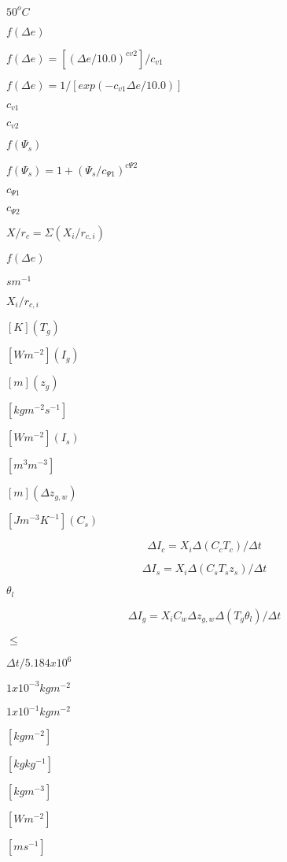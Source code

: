 \documentclass{article}
\begin{document}
$50^o C$
\pagebreak

$f( \Delta e )$
\pagebreak

$f( \Delta e) = [( \Delta e/10.0)^{cv2}]/c_{v1}$
\pagebreak

$f(\Delta e) = 1/[exp(-c_{v1} \Delta e/10.0)]$
\pagebreak

$c_{v1}$
\pagebreak

$c_{v2}$
\pagebreak

$f(\Psi_s)$
\pagebreak

$f(\Psi_s) = 1 + (\Psi_s / c_{\Psi 1})^{c \Psi 2}$
\pagebreak

$c_{\Psi 1}$
\pagebreak

$c_{\Psi 2}$
\pagebreak

$X/r_c = \Sigma (X_i / r_{c,i})$
\pagebreak

$f(\Delta e)$
\pagebreak

$s m^{-1}$
\pagebreak

$X_i / r_{c,i}$
\pagebreak

$[K] (T_g)$
\pagebreak

$[W m^{-2}] (I_g)$
\pagebreak

$[m] (z_g)$
\pagebreak

$[kg m^{-2} s^{-1} ]$
\pagebreak

$[W m^{-2}] (I_s)$
\pagebreak

$[m^3 m^{-3}]$
\pagebreak

$[m] (\Delta z_{g,w})$
\pagebreak

$[J m^{-3} K^{-1}] (C_s)$
\pagebreak

\[ \Delta I_c = X_i \Delta (C_c T_c )/ \Delta t \]
\pagebreak

\[ \Delta I_s = X_i \Delta (C_s T_s z_s )/ \Delta t \]
\pagebreak

$\theta_l$
\pagebreak

\[ \Delta I_g = X_i C_w \Delta z_{g,w} \Delta (T_g \theta_l )/ \Delta t \]
\pagebreak

$\leq$
\pagebreak

$ \Delta t /5.184x10^6 $
\pagebreak

$1x10^{-3} kg m^{-2}$
\pagebreak

$1x10^{-1} kg m^{-2}$
\pagebreak

$[kg m^{-2} ]$
\pagebreak

$[kg kg^{-1} ]$
\pagebreak

$[kg m^{-3} ]$
\pagebreak

$[W m^{-2} ]$
\pagebreak

$[m s^{-1} ]$
\pagebreak
\end{document}
